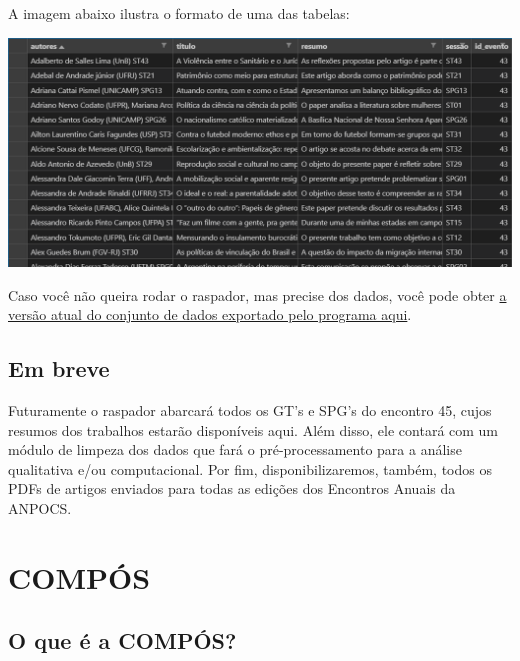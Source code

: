 \documentclass[
]{book}
\begin{document}
A imagem abaixo ilustra o formato de uma das tabelas:

\includegraphics{img/anpocs_scraper_csv.png}

Caso você não queira rodar o raspador, mas precise dos dados, você pode obter \href{https://drive.google.com/drive/folders/1XdHLf3b7r0d1EwwlYo4D0bRBujVILBq7?usp=sharing}{a versão atual do conjunto de dados exportado pelo programa aqui}.

\hypertarget{em-breve}{%
\section{Em breve}\label{em-breve}}

Futuramente o raspador abarcará todos os GT's e SPG's do encontro 45, cujos resumos dos trabalhos estarão disponíveis aqui. Além disso, ele contará com um módulo de limpeza dos dados que fará o pré-processamento para a análise qualitativa e/ou computacional. Por fim, disponibilizaremos, também, todos os PDFs de artigos enviados para todas as edições dos Encontros Anuais da ANPOCS.

\hypertarget{compuxf3s}{%
\chapter{COMPÓS}\label{compuxf3s}}

\hypertarget{o-que-uxe9-a-compuxf3s}{%
\section{O que é a COMPÓS?}\label{o-que-uxe9-a-compuxf3s}}
\end{document}
